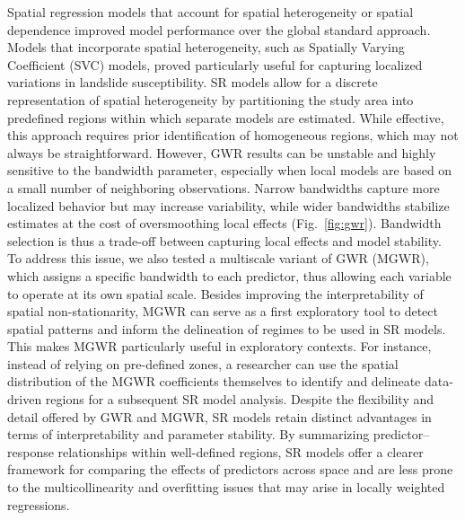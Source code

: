 \documentclass[lineno,pdflatex,sn-basic]{sn-jnl}%
\theoremstyle{thmstyleone}%
\theoremstyle{thmstyletwo}%
\theoremstyle{thmstylethree}%
\begin{document}
Spatial regression models that account for spatial heterogeneity or spatial dependence improved model performance over the global standard approach. Models that incorporate spatial heterogeneity, such as Spatially Varying Coefficient (SVC) models, proved particularly useful for capturing localized variations in landslide susceptibility. 
SR models allow for a discrete representation of spatial heterogeneity by partitioning the study area into predefined regions within which separate models are estimated. While effective, this approach requires prior identification of homogeneous regions, which may not always be straightforward.
However, GWR results can be unstable and highly sensitive to the bandwidth parameter, especially when local models are based on a small number of neighboring observations. 
Narrow bandwidths capture more localized behavior but may increase variability, while wider bandwidths stabilize estimates at the cost of oversmoothing local effects (Fig.~\ref{fig:gwr}).
Bandwidth selection is thus a trade-off between capturing local effects and model stability. 
To address this issue, we also tested a multiscale variant of GWR (MGWR), which assigns a specific bandwidth to each predictor, thus allowing each variable to operate at its own spatial scale. 
Besides improving the interpretability of spatial non-stationarity, MGWR can serve as a first exploratory tool to detect spatial patterns and inform the delineation of regimes to be used in SR models. 
This makes MGWR particularly useful in exploratory contexts. For instance, instead of relying on pre-defined zones, a researcher can use the spatial distribution of the MGWR coefficients themselves to identify and delineate data-driven regions for a subsequent SR model analysis.
Despite the flexibility and detail offered by GWR and MGWR, SR models retain distinct advantages in terms of interpretability and parameter stability. 
By summarizing predictor–response relationships within well-defined regions, SR models offer a clearer framework for comparing the effects of predictors across space and are less prone to the multicollinearity and overfitting issues that may arise in locally weighted regressions.
\end{document}
